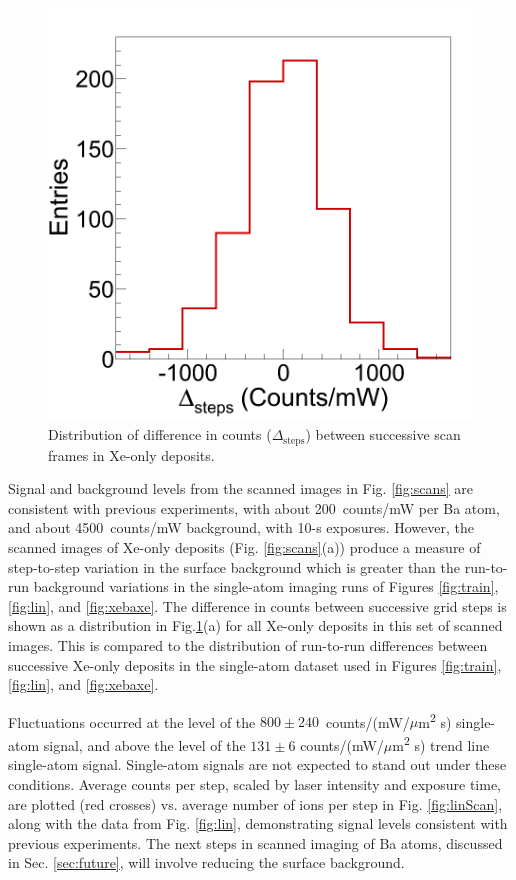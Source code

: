 \begin{figure} %
        \centering
                \includegraphics[width=.35\textwidth]{figures/scans_dframeXe.png}
                \caption{Distribution of difference in counts ($\Delta_{\text{steps}}$) between successive scan frames in Xe-only deposits.}
\label{fig:scanVarXe}
\end{figure}

Signal and background levels from the scanned images in Fig. \ref{fig:scans} are consistent with previous experiments, with about 200~counts/mW per Ba atom, and about 4500~counts/mW background, with 10-s exposures.  However, the scanned images of Xe-only deposits (Fig. \ref{fig:scans}(a)) produce a measure of step-to-step variation in the surface background which is greater than the run-to-run background variations in the single-atom imaging runs of Figures \ref{fig:train}, \ref{fig:lin}, and \ref{fig:xebaxe}.  The difference in counts between successive grid steps is shown as a distribution in Fig.\ref{fig:scanVarXe}(a) for all Xe-only deposits in this set of scanned images.  This is compared to the distribution of run-to-run differences between successive Xe-only deposits in the single-atom dataset used in Figures \ref{fig:train}, \ref{fig:lin}, and \ref{fig:xebaxe}. 

 Fluctuations occurred at the level of the $800 \pm 240$~counts/(mW/$\mu$m\textsuperscript{2} s) single-atom signal, and above the level of the $131 \pm 6$ counts/(mW/$\mu$m\textsuperscript{2} s) trend line single-atom signal.  Single-atom signals are not expected to stand out under these conditions.  Average counts per step, scaled by laser intensity and exposure time, are plotted (red crosses) vs. average number of ions per step in Fig. \ref{fig:linScan}, along with the data from Fig. \ref{fig:lin}, demonstrating signal levels consistent with previous experiments.  The next steps in scanned imaging of Ba atoms, discussed in Sec. \ref{sec:future}, will involve reducing the surface background.



